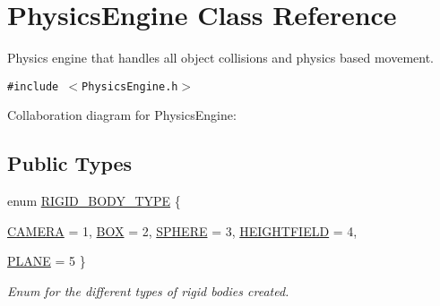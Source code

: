 \hypertarget{class_physics_engine}{
\section{PhysicsEngine Class Reference}
\label{class_physics_engine}
}
Physics engine that handles all object collisions and physics based movement.  


{\tt \#include $<$PhysicsEngine.h$>$}

Collaboration diagram for PhysicsEngine:\subsection*{Public Types}
\begin{CompactItemize}
\item 
enum \hyperlink{class_physics_engine_f9cf664e8df4f9a518448aa122957077}{RIGID\_\-BODY\_\-TYPE} \{ \par
\hyperlink{class_physics_engine_f9cf664e8df4f9a518448aa1229570775b12039b51b36d92231a67695ea07e28}{CAMERA} =  1, 
\hyperlink{class_physics_engine_f9cf664e8df4f9a518448aa122957077219567afcdbe1eb7fe073c81b43dd5c0}{BOX} =  2, 
\hyperlink{class_physics_engine_f9cf664e8df4f9a518448aa122957077d3a5fc2a81d07760aa5d18bb1b79cd9b}{SPHERE} =  3, 
\hyperlink{class_physics_engine_f9cf664e8df4f9a518448aa122957077504250562f6fb421a154714f65c870ad}{HEIGHTFIELD} =  4, 
\par
\hyperlink{class_physics_engine_f9cf664e8df4f9a518448aa122957077c9cfd25eead0581ed6bd4050b3cfbe13}{PLANE} =  5
 \}
\begin{CompactList}\small\item\em Enum for the different types of rigid bodies created. \item\end{CompactList}\end{CompactItemize}
